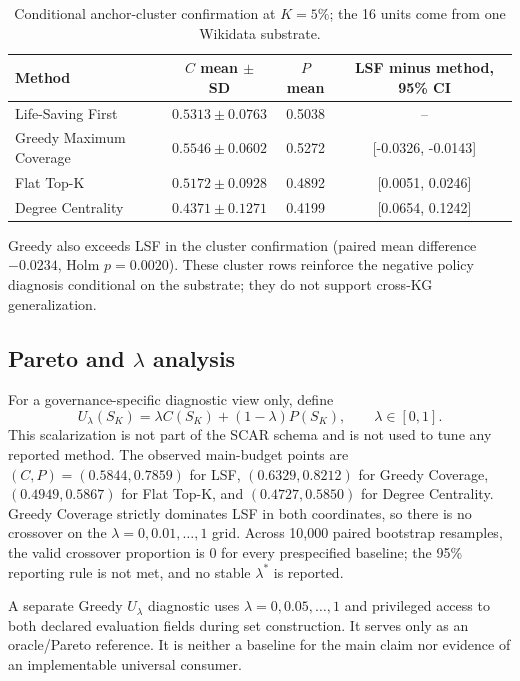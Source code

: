 \documentclass[pdflatex,sn-basic]{sn-jnl}
\begin{document}
\begin{table}[ht]
\caption{Conditional anchor-cluster confirmation at $K=5\%$; the 16 units come from one Wikidata substrate.}
\label{tab:supp-anchor-clusters}
\centering
\small
\begin{tabular}{lccc}
\toprule
Method & $C$ mean $\pm$ SD & $P$ mean & LSF minus method, 95\% CI \\
\midrule
Life-Saving First & $0.5313\pm0.0763$ & 0.5038 & -- \\
Greedy Maximum Coverage & $0.5546\pm0.0602$ & 0.5272 & [-0.0326, -0.0143] \\
Flat Top-K & $0.5172\pm0.0928$ & 0.4892 & [0.0051, 0.0246] \\
Degree Centrality & $0.4371\pm0.1271$ & 0.4199 & [0.0654, 0.1242] \\
\bottomrule
\end{tabular}
\end{table}

Greedy also exceeds LSF in the cluster confirmation (paired mean difference $-0.0234$, Holm $p=0.0020$). These cluster rows reinforce the negative policy diagnosis conditional on the substrate; they do not support cross-KG generalization.

\subsection{Pareto and \texorpdfstring{$\lambda$}{lambda} analysis}

For a governance-specific diagnostic view only, define
\begin{equation}
U_\lambda(S_K)=\lambda C(S_K)+(1-\lambda)P(S_K),\qquad \lambda\in[0,1].
\label{eq:supp-coverage-protection-utility}
\end{equation}
This scalarization is not part of the SCAR schema and is not used to tune any reported method. The observed main-budget points are $(C,P)=(0.5844,0.7859)$ for LSF, $(0.6329,0.8212)$ for Greedy Coverage, $(0.4949,0.5867)$ for Flat Top-K, and $(0.4727,0.5850)$ for Degree Centrality. Greedy Coverage strictly dominates LSF in both coordinates, so there is no crossover on the $\lambda=0,0.01,\ldots,1$ grid. Across 10,000 paired bootstrap resamples, the valid crossover proportion is 0 for every prespecified baseline; the 95\% reporting rule is not met, and no stable $\lambda^*$ is reported.

A separate Greedy $U_\lambda$ diagnostic uses $\lambda=0,0.05,\ldots,1$ and privileged access to both declared evaluation fields during set construction. It serves only as an oracle/Pareto reference. It is neither a baseline for the main claim nor evidence of an implementable universal consumer.
\end{document}
